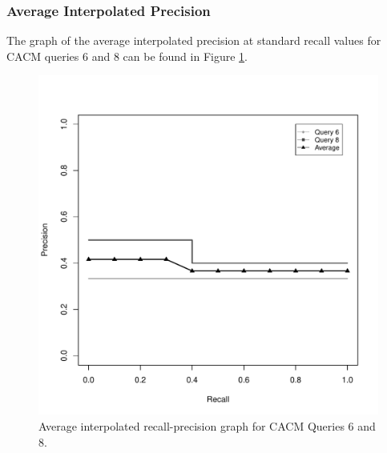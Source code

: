 \clearpage

\subsubsection{Average Interpolated Precision}
The graph of the average interpolated precision at standard recall values for CACM queries 6 and 8 can be found in Figure \ref{fig:aiprgraph68}.

\begin{figure}[H]
\centering
\label{fig:aiprgraph68}
\includegraphics[scale=.7]{code/getrel/aipr68.pdf}
\caption{Average interpolated recall-precision graph for CACM Queries 6 and 8.}
\end{figure}




